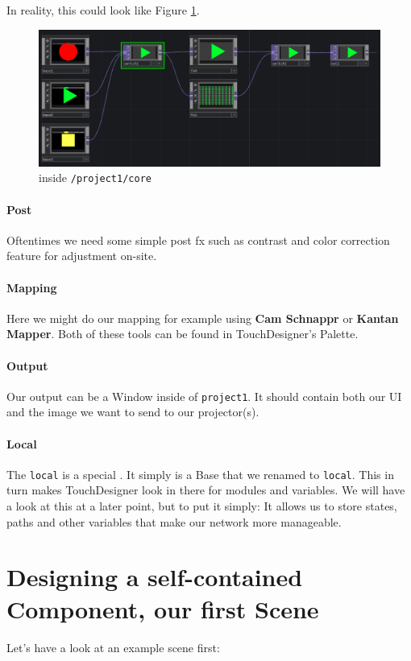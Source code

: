 In reality, this could look like Figure \ref{fig:insideCore}.

\begin{figure}[H]
	\centering
	\includegraphics[width=\textwidth]{img/structure2.PNG}
	\caption[shortCaption]
	{inside \texttt{/project1/core}}
	\label{fig:insideCore}
\end{figure}


\paragraph*{Post}
Oftentimes we need some simple post fx such as contrast and color correction feature for adjustment on-site.
\paragraph*{Mapping}
Here we might do our mapping for example using \textbf{Cam Schnappr} or \textbf{Kantan Mapper}. Both of these tools can be found in TouchDesigner's Palette.
\paragraph*{Output}
Our output can be a Window \COMP inside of \texttt{project1}. It should contain both our UI and the image we want to send to our projector(s).
\paragraph*{Local}
The \texttt{local} \COMP is a special \COMP. It simply is a Base \COMP that we renamed to \texttt{local}. This in turn makes TouchDesigner look in there for modules and variables. We will have a look at this at a later point, but to put it simply: It allows us to store states, paths and other variables that make our network more manageable.



\section{Designing a self-contained Component, our first Scene}
Let's have a look at an example scene first:

